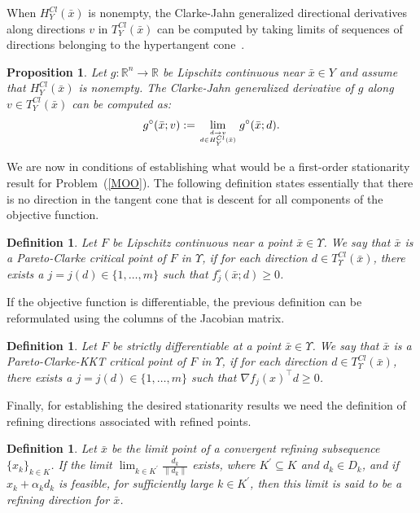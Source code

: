 \documentclass[12pt]{article}
\newtheorem{definition}[theorem]{Definition}
\newtheorem{proposition}[theorem]{Proposition}
\newcommand{\set}[1]{\{#1\}}
\begin{document}
When $H^{Cl}_Y(\bar{x})$ is nonempty, the Clarke-Jahn generalized
directional derivatives along directions $v$ in
$T^{Cl}_Y(\bar{x})$ can be computed by taking limits of sequences
of directions belonging to the hypertangent cone~\cite{audet2006}.

\begin{proposition}
Let $g:\mathbb{R}^n\to\mathbb{R}$ be Lipschitz continuous near
$\bar{x}\in Y$ and assume that $H^{Cl}_Y(\bar{x})$ is nonempty.
The Clarke-Jahn generalized derivative of $g$ along $v\in
T^{Cl}_Y(\bar{x})$ can be computed as:
\begin{equation*}
g^\circ(\bar{x};v):=\lim_{d\to v \atop d\in H^{Cl}_Y(\bar{x})}
g^\circ(\bar{x};d).
\end{equation*}
\end{proposition}

We are now in conditions of establishing what would be a
first-order stationarity result for Problem~(\ref{MOO}). The
following definition states essentially that there is no direction
in the tangent cone that is descent for all components of the
objective function.
\begin{definition}
Let $F$ be Lipschitz continuous near a point $\bar{x}\in
\Upsilon$. We say that $\bar{x}$ is a Pareto-Clarke critical point
of $F$ in $\Upsilon$, if for each direction $d\in
T^{Cl}_{\Upsilon}(\bar{x})$, there exists a
$j=j(d)\in\set{1,\ldots,m}$ such that
$f_{j}^{\circ}(\bar{x};d)\geq 0$.
\end{definition}

If the objective function is differentiable, the previous
definition can be reformulated using the columns of the Jacobian
matrix.

\begin{definition}
Let $F$ be strictly differentiable at a point $\bar{x}\in
\Upsilon$. We say that $\bar{x}$ is a Pareto-Clarke-KKT critical
point of $F$ in $\Upsilon$, if for each direction $d\in
T_{\Upsilon}^{Cl}(\bar{x})$, there exists a
$j=j(d)\in\set{1,\ldots,m}$ such that $\nabla f_{j}(x)^\top d \geq
0$.
\end{definition}

Finally, for establishing the desired stationarity results we need
the definition of refining directions associated with refined
points.

\begin{definition}
\label{refdirection} Let $\bar{x}$ be the limit point of a
convergent refining subsequence $\set{x_k}_{k\in K}$. If the limit
$\displaystyle \lim_{k\in K^\prime} \frac{d_k}{\|d_k\|}$ exists,
where $K^\prime\subseteq K$ and $d_k\in D_k$, and if $x_k+\alpha_k
d_k$ is feasible, for sufficiently large $k\in K^\prime$, then
this limit is said to be a refining direction for $\bar{x}$.
\end{definition}
\end{document}
